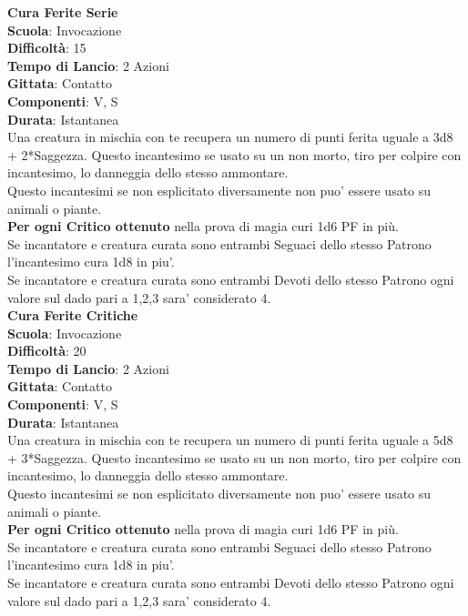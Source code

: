 \begin{multicols}{2}
\medskip\textbf{Cura Ferite Serie}\\
\textbf{Scuola}: Invocazione\\
\textbf{Difficoltà}: 15\\
\textbf{Tempo di Lancio}: 2 Azioni\\
\textbf{Gittata}: Contatto\\
\textbf{Componenti}: V, S\\
\textbf{Durata}: Istantanea\\
Una creatura in mischia con te recupera un numero di punti ferita uguale a 3d8 + 2*Saggezza. Questo incantesimo se usato su un non morto, tiro per colpire con incantesimo, lo danneggia dello stesso ammontare.\\
Questo incantesimi se non esplicitato diversamente non puo' essere usato su animali o piante.\\
\textbf{Per ogni Critico ottenuto} nella prova di magia curi 1d6 PF in più.\\
Se incantatore e creatura curata sono entrambi Seguaci dello stesso Patrono l'incantesimo cura 1d8 in piu'.\\
Se incantatore e creatura curata sono entrambi Devoti dello stesso Patrono ogni valore sul dado pari a 1,2,3 sara' considerato 4.\\

\medskip\textbf{Cura Ferite Critiche}\\
\textbf{Scuola}: Invocazione\\
\textbf{Difficoltà}: 20 \\
\textbf{Tempo di Lancio}: 2 Azioni\\
\textbf{Gittata}: Contatto\\
\textbf{Componenti}: V, S\\
\textbf{Durata}: Istantanea\\
Una creatura in mischia con te recupera un numero di punti ferita uguale a 5d8 + 3*Saggezza. Questo incantesimo se usato su un non morto, tiro per colpire con incantesimo, lo danneggia dello stesso ammontare.\\
Questo incantesimi se non esplicitato diversamente non puo' essere usato su animali o piante.\\
\textbf{Per ogni Critico ottenuto} nella prova di magia curi 1d6 PF in più.\\
Se incantatore e creatura curata sono entrambi Seguaci dello stesso Patrono l'incantesimo cura 1d8 in piu'.\\
Se incantatore e creatura curata sono entrambi Devoti dello stesso Patrono ogni valore sul dado pari a 1,2,3 sara' considerato 4.\\


\end{multicols}
